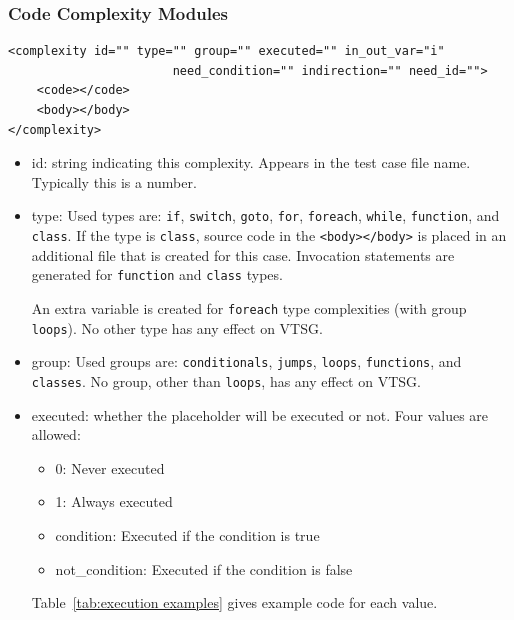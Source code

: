 \documentclass[12pt]{article}
\begin{document}
\subsubsection{Code Complexity Modules}
\label{sec: complexity modules}

\begin{verbatim}
<complexity id="" type="" group="" executed="" in_out_var="i" 
                       need_condition="" indirection="" need_id="">
    <code></code>
    <body></body>
</complexity>
\end{verbatim}

\begin{itemize}
    \item id: string indicating this complexity.  Appears in the test case
      file name.  Typically this is a number.

    \item type: Used types are: \verb|if|, \verb|switch|, \verb|goto|,
    \verb|for|, \verb|foreach|, \verb|while|,
    \verb|function|, and \verb|class|.
    If the type is \verb|class|, source code in the \verb|<body></body>| is placed in
    an additional file that is created for this case.
    Invocation statements are generated for \verb|function| and \verb|class| types.

    An extra variable is created for \verb|foreach| type complexities (with group
    \verb|loops|).
    No other type has any effect on VTSG.

    \item group: Used groups are: \verb|conditionals|, \verb|jumps|,
    \verb|loops|, \verb|functions|, and \verb|classes|.
    No group, other than \verb|loops|, has any effect on VTSG.

    \item executed: whether the placeholder will be executed or not. Four 
    values are allowed:
    \begin{itemize}[nosep]
        \item 0: Never executed
        \item 1: Always executed
        \item condition:  Executed if the condition is true
        \item not\_condition:  Executed if the condition is false
    \end{itemize}
    Table~\ref{tab:execution examples} gives example code for each value.


\end{itemize}
\end{document}
